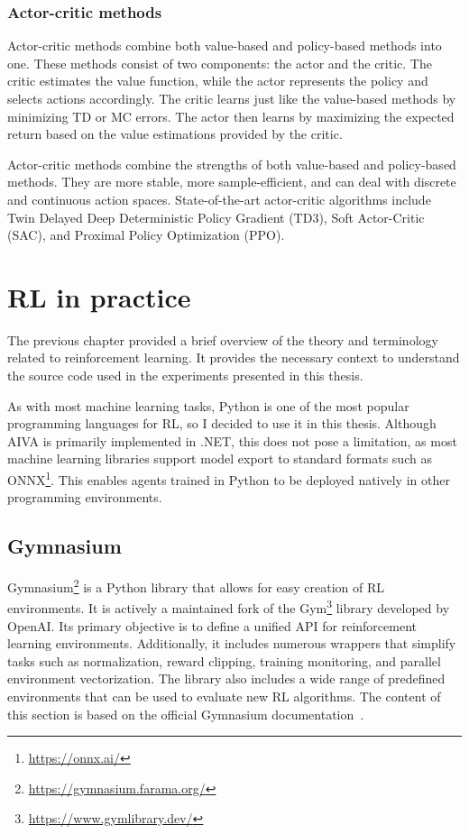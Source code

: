 \documentclass[
  digital,     %
  oneside,     %
  nosansbold,  %
  nocolorbold, %
  lof,         %
  lot,         %
]{fithesis4}
\begin{document}
\subsection{Actor-critic methods}

Actor-critic methods combine both value-based and policy-based methods into one. These methods consist of two components: the actor and the critic. The critic estimates the value function, while the actor represents the policy and selects actions accordingly. The critic learns just like the value-based methods by minimizing TD or MC errors. The actor then learns by maximizing the expected return based on the value estimations provided by the critic.

Actor-critic methods combine the strengths of both value-based and policy-based methods. They are more stable, more sample-efficient, and can deal with discrete and continuous action spaces. State-of-the-art actor-critic algorithms include Twin Delayed Deep Deterministic Policy Gradient (TD3), Soft Actor-Critic (SAC), and Proximal Policy Optimization (PPO).

\chapter{RL in practice}

The previous chapter provided a brief overview of the theory and terminology related to reinforcement learning. It provides the necessary context to understand the source code used in the experiments presented in this thesis.

As with most machine learning tasks, Python is one of the most popular programming languages for RL, so I decided to use it in this thesis. Although AIVA is primarily implemented in .NET, this does not pose a limitation, as most machine learning libraries support model export to standard formats such as ONNX\footnote{\url{https://onnx.ai/}}. This enables agents trained in Python to be deployed natively in other programming environments.

\section{Gymnasium}
\label{sec:gym}
Gymnasium\footnote{\url{https://gymnasium.farama.org/}} is a Python library that allows for easy creation of RL environments. It is actively a maintained fork of the Gym\footnote{\url{https://www.gymlibrary.dev/}} library developed by OpenAI. Its primary objective is to define a unified API for reinforcement learning environments. Additionally, it includes numerous wrappers that simplify tasks such as normalization, reward clipping, training monitoring, and parallel environment vectorization. The library also includes a wide range of predefined environments that can be used to evaluate new RL algorithms. The content of this section is based on the official Gymnasium documentation~\cite{gym-docs}.
\end{document}
